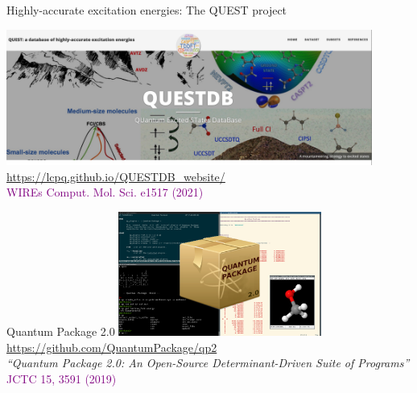 \documentclass[aspectratio=169,9pt]{beamer}
\newcommand{\pub}[1]{{\small \textcolor{purple}{#1}}}
\begin{document}
\begin{frame}{Highly-accurate excitation energies: The QUEST project}
        \begin{center}
                \includegraphics[width=0.9\textwidth]{fig/TOC_QUEST}
                \\
                \bigskip
                \url{https://lcpq.github.io/QUESTDB_website/}
                \\
                \bigskip
		\pub{WIREs Comput. Mol. Sci. e1517 (2021)}
        \end{center}
\end{frame}


\begin{frame}{Quantum Package 2.0}
        \centering
        \includegraphics[width=0.5\textwidth]{fig/TOC_QP2}
        \\
        \bigskip
	\url{https://github.com/QuantumPackage/qp2}
        \\
        \bigskip
        {\em ``Quantum Package 2.0: An Open-Source Determinant-Driven Suite of Programs''}\\
        \bigskip
	\pub{JCTC 15, 3591 (2019)}
\end{frame}
\end{document}
